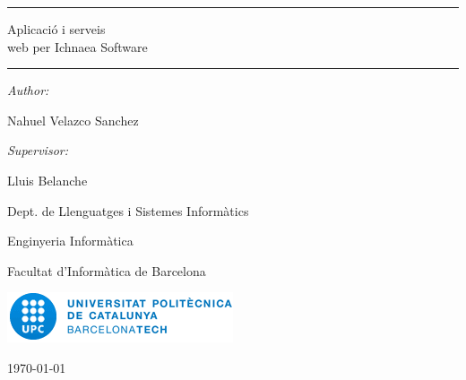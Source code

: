 \begin{titlepage}

\begin{center}
\vspace{4 cm}

\hrule
\vspace{4 mm}
\huge{Aplicaci\'{o} i serveis \\
web per Ichnaea Software}
\vspace{4 mm}
\hrule

\vspace{2 cm}

\large{\emph{Author:}}

\large{Nahuel Velazco Sanchez} \\

\vspace{1 cm}

\large{\emph{Supervisor:}}

\large{Lluis Belanche} \\

\vspace{1 cm}

\large{Dept. de Llenguatges i Sistemes Inform\`{a}tics} \\

\vspace{4 cm}

\large{Enginyeria Inform\`{a}tica} 

\large{Facultat d'Inform\`{a}tica de Barcelona} 

\vspace{1.5 cm}

\includegraphics[scale=0.5]{upc}

\vfill

\large{\today}

\end{center}

\end{titlepage}
